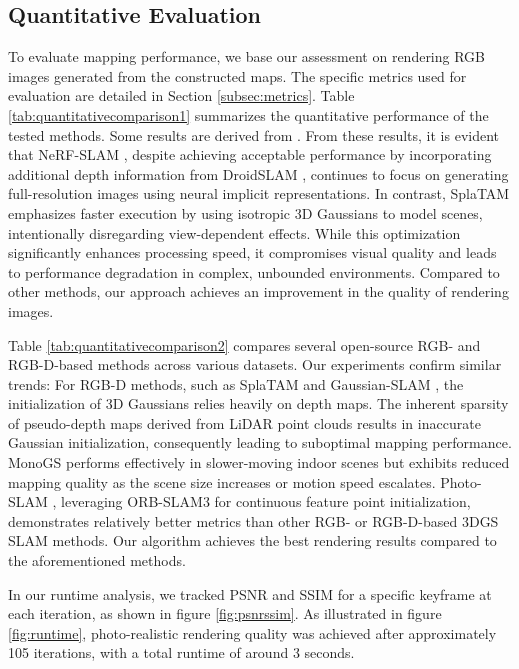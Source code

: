 \documentclass[lettersize,journal]{IEEEtran}
\begin{document}
\subsection{Quantitative Evaluation}
\label{subsec:quantitativeevaluation}
To evaluate mapping performance, we base our assessment on rendering RGB images generated from the constructed maps. The specific metrics used for evaluation are detailed in Section \ref{subsec:metrics}. Table \ref{tab:quantitativecomparison1} summarizes the quantitative performance of the tested methods. Some results are derived from \cite{gaussianlic}. From these results, it is evident that NeRF-SLAM \cite{nerfslam}, despite achieving acceptable performance by incorporating additional depth information from DroidSLAM \cite{droidslam}, continues to focus on generating full-resolution images using neural implicit representations. In contrast, SplaTAM \cite{splatam} emphasizes faster execution by using isotropic 3D Gaussians to model scenes, intentionally disregarding view-dependent effects. While this optimization significantly enhances processing speed, it compromises visual quality and leads to performance degradation in complex, unbounded environments. Compared to other methods, our approach achieves an improvement in the quality of rendering images.

Table \ref{tab:quantitativecomparison2} compares several open-source RGB- and RGB-D-based methods across various datasets. Our experiments confirm similar trends: For RGB-D methods, such as SplaTAM \cite{splatam} and Gaussian-SLAM \cite{gaussianslam}, the initialization of 3D Gaussians relies heavily on depth maps. The inherent sparsity of pseudo-depth maps derived from LiDAR point clouds results in inaccurate Gaussian initialization, consequently leading to suboptimal mapping performance. MonoGS performs effectively in slower-moving indoor scenes but exhibits reduced mapping quality as the scene size increases or motion speed escalates. Photo-SLAM \cite{photoslam}, leveraging ORB-SLAM3 \cite{orbslam3} for continuous feature point initialization, demonstrates relatively better metrics than other RGB- or RGB-D-based 3DGS SLAM methods. Our algorithm achieves the best rendering results compared to the aforementioned methods.

In our runtime analysis, we tracked PSNR and SSIM for a specific keyframe at each iteration, as shown in figure \ref{fig:psnrssim}. As illustrated in figure \ref{fig:runtime}, photo-realistic rendering quality was achieved after approximately 105 iterations, with a total runtime of around 3 seconds.
\end{document}
